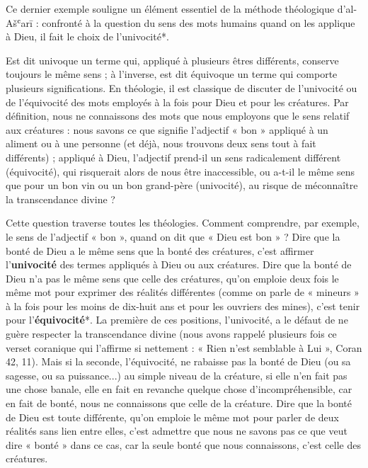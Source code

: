 Ce dernier exemple souligne un élément essentiel de la méthode
théologique d'al-Ašʿarī : confronté à la question du sens des mots
humains quand on les applique à Dieu, il fait le choix de l'univocité*.
\begin{Def} Est dit univoque un terme qui, appliqué à plusieurs êtres différents, conserve toujours le même sens ; à l’inverse, est dit équivoque un terme qui comporte plusieurs significations. En théologie, il est classique de discuter de l’univocité ou de l’équivocité des mots employés à la fois pour Dieu et pour les créatures. Par définition, nous ne connaissons des mots que nous employons que le sens relatif aux créatures : nous savons ce que signifie l’adjectif « bon » appliqué à un aliment ou à une personne (et déjà, nous trouvons deux sens tout à fait différents) ; appliqué à Dieu, l’adjectif prend-il un sens radicalement différent (équivocité), qui risquerait alors de nous être inaccessible, ou a-t-il le même sens que pour un bon vin ou un bon grand-père (univocité), au risque de méconnaître la transcendance divine ? 
\end{Def}
Cette question traverse toutes les théologies. Comment comprendre, par
exemple, le sens de l'adjectif « bon », quand on dit que « Dieu est bon
» ? Dire que la bonté de Dieu a le même sens que la bonté des créatures,
c'est affirmer l'\textbf{univocité} des termes appliqués à Dieu ou aux
créatures. Dire que la bonté de Dieu n'a pas le même sens que celle des
créatures, qu'on emploie deux fois le même mot pour exprimer des
réalités différentes (comme on parle de
« mineurs » à la fois pour les moins de dix-huit ans et pour les
ouvriers des mines), c'est tenir pour l'\textbf{équivocité}*. La
première de ces positions, l'univocité, a le défaut de ne guère
respecter la transcendance divine (nous avons rappelé plusieurs fois ce
verset coranique qui l'affirme si nettement : « Rien n'est semblable à
Lui », Coran 42, 11). Mais si la seconde, l'équivocité, ne rabaisse pas
la bonté de Dieu (ou sa sagesse, ou sa puissance...) au simple niveau de
la créature, si elle n'en fait pas une chose banale, elle en fait en
revanche quelque chose d'incompréhensible, car en fait de bonté, nous ne
connaissons que celle de la créature. Dire que la bonté de Dieu est
toute différente, qu'on emploie le même mot pour parler de deux réalités
sans lien entre elles, c'est admettre que nous ne savons pas ce que veut
dire « bonté » dans ce cas, car la seule bonté que nous connaissons,
c'est celle des créatures.

